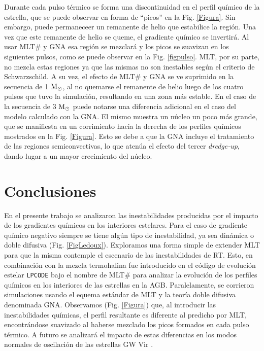 \documentclass[baaa]{baaa}
\begin{document}

Durante cada pulso térmico se forma una discontinuidad en el perfil químico de la estrella, que se puede observar en forma de ``picos'' en la Fig. \ref{Figura}. Sin embargo, puede permaneceer un remanente de helio que estabilice la región. Una vez que este remanente de helio se queme, el gradiente químico se invertirá. Al usar MLT\# y GNA esa región se mezclará y los picos se suavizan en los siguientes pulsos, como se puede observar en la Fig. \ref{figpulso}.   MLT, por su parte, no mezcla estas regiones ya que las mismas no son inestables según el criterio de Schwarzschild. A su vez, el efecto de MLT\# y GNA se ve suprimido en la secuencia de 1 $\rm M_\odot$, al no quemarse el remanente de helio luego de los cuatro pulsos que tuvo la simulación, resultando en una zona más estable. 
 En el caso de la secuencia de 3 $\rm M_\odot$ puede notarse una diferencia adicional en el caso del modelo calculado con la GNA. El mismo muestra un núcleo un poco más grande, que se manifiesta en un corrimiento hacia la derecha de los perfiles químicos mostrados en la Fig.  \ref{Figura}. Esto se debe a que la GNA incluye el tratamiento de las regiones semiconvectivas, lo que atenúa el efecto del tercer \textit{dredge-up}, dando lugar a un mayor crecimiento del núcleo.




\section{Conclusiones}

En el presente trabajo se analizaron las inestabilidades producidas por el impacto de los gradientes químicos en los interiores estelares. Para el caso de gradiente químico negativo siempre se tiene algún tipo de inestabilidad, ya sea dinámica o doble difusiva (Fig. \ref{FigLedoux}). Exploramos una forma simple de extender MLT para que la misma contemple el escenario de las inestabilidades de RT. Esto, en combinación con la mezcla termohalina fue introducido en el código de evolución estelar \texttt{LPCODE} bajo el nombre de MLT\# para analizar la evolución de los perfiles químicos en los interiores de las estrellas en la AGB. Paralelamente, se corrieron simulaciones usando el equema estándar de MLT y la teoría doble difusiva denominada GNA. Observamos (Fig. \ref{Figura}) que, al introducir las inestabilidades químicas, el perfil resultante es diferente al predicho por MLT, encontrándose suavizado al haberse mezclado los picos formados en cada pulso térmico. A futuro se analizará el impacto de estas diferencias en los modos normales de oscilación de las estrellas GW Vir \citep{2019A&ARv..27....7C}.
\end{document}
